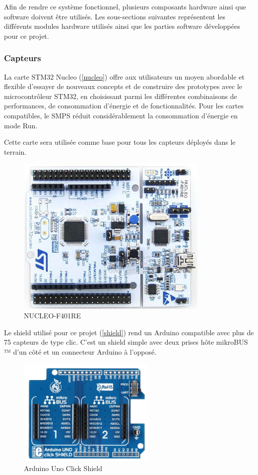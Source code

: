 \documentclass[12pt]{article}
\begin{document}
Afin de rendre ce système fonctionnel, plusieurs composants hardware ainsi que software doivent être utilisés. Les sous-sections suivantes représentent les différents modules hardware utilisés ainsi que les parties software développées pour ce projet.

\subsubsection{Capteurs}
La carte STM32 Nucleo (\autoref{nucleo}) offre aux utilisateurs un moyen abordable et flexible d'essayer de nouveaux concepts et de construire des prototypes avec le microcontrôleur STM32, en choisissant parmi les différentes combinaisons de performances, de consommation d'énergie et de fonctionnalités. Pour les cartes compatibles, le SMPS réduit considérablement la consommation d'énergie en mode Run.

Cette carte sera utilisée comme base pour tous les capteurs déployés dans le terrain.

\begin{figure}[!h]
	\centering
	\includegraphics[width=350px]{nucleo}
	\caption{NUCLEO-F401RE}
	\label{nucleo}
\end{figure}

\newpage
Le shield utilisé pour ce projet (\autoref{shield}) rend un Arduino compatible avec plus de 75 capteurs de type clic. C'est un shield simple avec deux prises hôte mikroBUS ™ d'un côté et un connecteur Arduino à l'opposé.

\begin{figure}[!h]
	\centering
	\includegraphics[width=250px]{shield}
	\caption{Arduino Uno Click Shield}
	\label{shield}
\end{figure}
\end{document}
